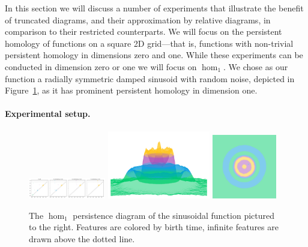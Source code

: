 
In this section we will discuss a number of experiments that illustrate the benefit of truncated diagrams, and their approximation by relative diagrams, in comparison to their restricted counterparts.
We will focus on the persistent homology of functions on a square 2D grid---that is, functions with non-trivial persistent homology in dimensions zero and one.
While these experiments can be conducted in dimension zero or one we will focus on $\hom_1$.
We chose as our function a radially symmetric damped sinusoid with random noise, depicted in Figure~\ref{fig:ripple1}, as it has prominent persistent homology in dimension one.

\paragraph*{Experimental setup.}

\begin{figure}[htbp]
  \centering
  \includegraphics[trim=0 0 790 0, clip, width=0.3\textwidth]{scripts/figures/matching2/full-dgm.pdf}
  \includegraphics[trim=-350 -800 -700 -300, clip, width=0.4\textwidth]{scripts/figures/matching2/full-surf_side-lowres.png}
  \includegraphics[trim=0 -800 0 0, width=0.25\textwidth]{scripts/figures/matching2/full-surf_top-lowres.png}
  \caption{The $\hom_1$ persistence diagram of the sinusoidal function pictured to the right.
  Features are colored by birth time, infinite features are drawn above the dotted line.}\label{fig:ripple1}
\end{figure}

